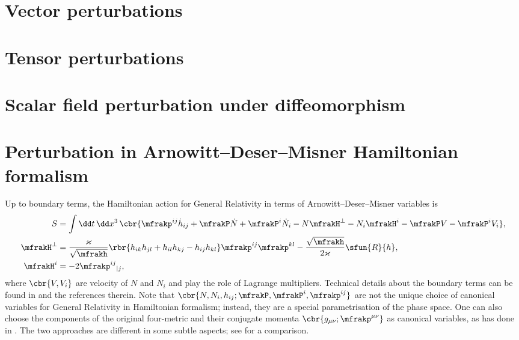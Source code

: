 \documentclass[a4paper,11pt]{article}
\begin{document}
\section{Vector perturbations}



\section{Tensor perturbations}



\section{Scalar field perturbation under diffeomorphism}


\section{Perturbation in Arnowitt--Deser--Misner Hamiltonian formalism}


Up to boundary terms, the Hamiltonian action for General Relativity in terms 
of Arnowitt--Deser--Misner variables is \cite[ch.4.2.2]{Kiefer2012}
\begin{align}
S &= \int\dd t\,\dd x^3\,\cbr{
\mfrakp^{ij}\dot{h}_{ij} + \mfrakP\dot{N} + \mfrakP^i \dot{N}_i
-N\mfrakH^\perp - N_i\mfrakH^i - \mfrakP V - \mfrakP^i V_i}, \\
\mfrakH^\perp &= \frac{\varkappa}{\sqrt{\mfrakh}}\rbr{
h_{ik}h_{jl} + h_{il}h_{kj} - h_{ij}h_{kl}} \mfrakp^{ij}\mfrakp^{kl}
- \frac{\sqrt{\mfrakh}}{2\varkappa} \sfun{R}{h}, \\
\mfrakH^i &= -2 \mfrakp^{ij}{}_{|j},
\end{align}
where $\cbr{V, V_i}$ are velocity of $N$ and $N_i$ and play the role of 
Lagrange multipliers. Technical details about the boundary terms can be 
found in \cite[ch.\ 4.2]{Poisson2004} and the references therein. Note that 
$\cbr{N, N_i, h_{ij}; \mfrakP, \mfrakP^i, \mfrakp^{ij}}$ are not the unique 
choice of canonical variables for General Relativity in Hamiltonian formalism; 
instead, they are a special parametrisation of the phase space. One can also 
choose the components of the original four-metric and their conjugate momenta 
$\cbr{g_{\mu\nu}; \mfrakp^{\mu\nu}}$ as canonical variables, as 
\citeauthor{Dirac1958} has done in \cite{Dirac1958}. The two approaches are 
different in some subtle aspects; see 
\cite{Kiriushcheva2008} for a comparison.
\end{document}
